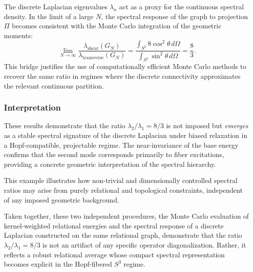     The discrete Laplacian eigenvalues $\lambda_n$ act as a proxy for the continuous spectral density.
    In the limit of a large $N$, the spectral response of the graph to projection $\Pi$ becomes consistent with the
    Monte Carlo integration of the geometric moments:
    \begin{equation}
      \lim_{N \to \infty} \frac{\lambda_{\text{shear}}(G_N)}{\lambda_{\text{transverse}}(G_N)} =
      \frac{\int_{S^3} 8 \cos^2 \theta \, d\Omega}{\int_{S^3} \sin^2 \theta \, d\Omega} = \frac{8}{3}.
    \end{equation}
    This bridge justifies the use of computationally efficient Monte Carlo methods to recover the same ratio in regimes
    where the discrete connectivity approximates the relevant continuous partition.

  \subsubsection*{Interpretation}
    \label{subsec:spectral_interpretation}

    These results demonstrate that the ratio $\lambda_2/\lambda_1 = 8/3$
    is not imposed but \emph{emerges}
        as a stable spectral signature of the discrete Laplacian under biased relaxation in
        a Hopf-compatible, projectable regime.
        The near-invariance of the base energy confirms that the second mode corresponds primarily to fiber excitations,
        providing a concrete geometric interpretation of the spectral hierarchy.

        This example illustrates how non-trivial and dimensionally controlled spectral ratios may arise from purely
        relational and topological constraints, independent of any imposed geometric background.

        Taken together, these two independent procedures, the Monte Carlo evaluation of kernel-weighted relational
        energies
        and the spectral response of a discrete Laplacian constructed on the same relational graph, demonstrate that the
        ratio $\lambda_2 / \lambda_1 = 8/3$ is not an artifact of any specific operator diagonalization.
    Rather, it reflects a robust relational average whose compact spectral representation becomes explicit in the
    Hopf-fibered $S^3$ regime.

